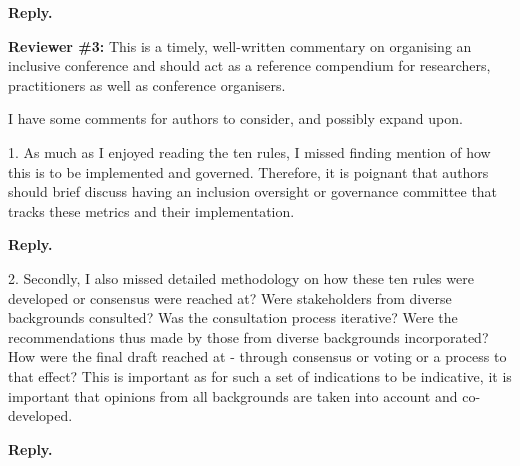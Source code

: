 \documentclass{article}
\newenvironment{Reply}{\noindent\color{BlueViolet}\textbf{Reply.}}{\vspace{1em}}
\begin{document}
\begin{Reply}

\end{Reply}

\textbf{Reviewer \#3:} 
This is a timely, well-written commentary on organising an inclusive conference and should act as a reference compendium for researchers, practitioners as well as conference organisers.

I have some comments for authors to consider, and possibly expand upon.

1. As much as I enjoyed reading the ten rules, I missed finding mention of how this is to be implemented and governed. Therefore, it is poignant that authors should brief discuss having an inclusion oversight or governance committee that tracks these metrics and their implementation.

\begin{Reply}
\end{Reply}

2. Secondly, I also missed detailed methodology on how these ten rules were developed or consensus were reached at? Were stakeholders from diverse backgrounds consulted? Was the consultation process iterative? Were the recommendations thus made by those from diverse backgrounds incorporated? How were the final draft reached at - through consensus or voting or a process to that effect? This is important as for such a set of indications to be indicative, it is important that opinions from all backgrounds are taken into account and co-developed.

\begin{Reply}
\end{Reply}
\end{document}
